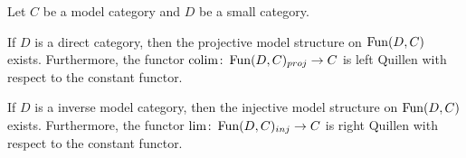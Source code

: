 \begin{thm}\label{thm:exProjInjModelStr}
    Let $C$ be a model category and $D$ be a small category.

    If $D$ is a direct category, then the projective model structure on $\operatorname{Fun}(D,C)$ exists. 
    Furthermore, the functor $\operatorname*{colim}\colon\operatorname{Fun}(D,C)_{proj}\to C$ is left Quillen with respect to the constant functor.

    If $D$ is a inverse model category, then the injective model structure on $\operatorname{Fun}(D,C)$ exists.
    Furthermore, the functor $\lim\colon\operatorname{Fun}(D,C)_{inj}\to C$ is right Quillen with respect to the constant functor.
    \begin{reference}
        \cite[Theorem 5.1.3 and Corollary 5.1.6]{hovey2007model}
    \end{reference}
\end{thm}
